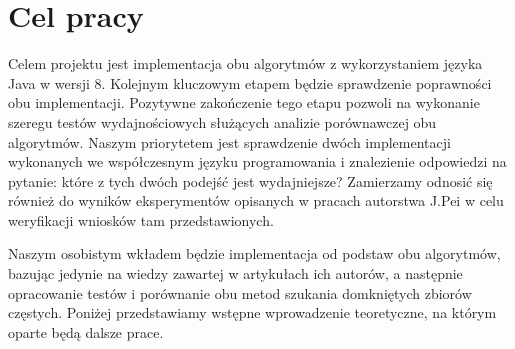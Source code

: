 \section{Cel pracy}

Celem projektu jest implementacja obu algorytmów z wykorzystaniem języka Java w wersji 8.
Kolejnym kluczowym etapem będzie sprawdzenie poprawności obu implementacji.
Pozytywne zakończenie tego etapu pozwoli na wykonanie szeregu testów wydajnościowych służących analizie porównawczej obu algorytmów.
Naszym priorytetem jest sprawdzenie dwóch implementacji wykonanych we współczesnym języku programowania i znalezienie odpowiedzi na pytanie: które z tych dwóch podejść jest wydajniejsze?
Zamierzamy odnosić się również do wyników eksperymentów opisanych w pracach autorstwa J.Pei \cite{closetArt} w celu weryfikacji wniosków tam przedstawionych.

Naszym osobistym wkładem będzie implementacja od podstaw obu algorytmów, bazując jedynie na wiedzy zawartej w artykułach ich autorów, a następnie opracowanie testów i porównanie obu metod szukania domkniętych zbiorów częstych.
Poniżej przedstawiamy wstępne wprowadzenie teoretyczne, na którym oparte będą dalsze prace.